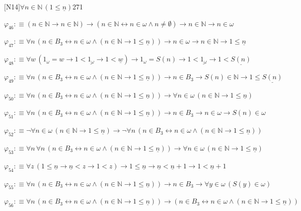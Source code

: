 \begin{fullproof}{[N14]}{$\forall n \in \mathbb{N}\,(1 \leq \underline{n})$}{271}
\begin{abbrevlist}
\item $\varphi_{46} :\equiv (n \in \mathbb{N} \to n \in \mathbb{N}) \to (n \in \mathbb{N} \leftrightarrow n \in \omega \land n \neq \emptyset) \to n \in \mathbb{N} \to n \in \omega$
\item $\varphi_{47} :\equiv \forall n\,(n \in B_{3} \leftrightarrow n \in \omega \land (n \in \mathbb{N} \to 1 \leq \underline{n})) \to n \in \omega \to n \in \mathbb{N} \to 1 \leq \underline{n}$
\item $\varphi_{48} :\equiv \forall w\,(1_{\omega} = w \to 1 < \underline{1_{\omega}} \to 1 < \underline{w}) \to 1_{\omega} = S(n) \to 1 < \underline{1_{\omega}} \to 1 < \underline{S(n)}$
\item $\varphi_{49} :\equiv \forall n\,(n \in B_{3} \leftrightarrow n \in \omega \land (n \in \mathbb{N} \to 1 \leq \underline{n})) \to n \in B_{3} \to S(n) \in \mathbb{N} \to 1 \leq \underline{S(n)}$
\item $\varphi_{50} :\equiv \forall n\,(n \in B_{3} \leftrightarrow n \in \omega \land (n \in \mathbb{N} \to 1 \leq \underline{n})) \to \forall n \in \omega\,(n \in \mathbb{N} \to 1 \leq \underline{n})$
\item $\varphi_{51} :\equiv \forall n\,(n \in B_{3} \leftrightarrow n \in \omega \land (n \in \mathbb{N} \to 1 \leq \underline{n})) \to n \in B_{3} \to n \in \omega \to S(n) \in \omega$
\item $\varphi_{52} :\equiv \neg \forall n \in \omega\,(n \in \mathbb{N} \to 1 \leq \underline{n}) \to \neg \forall n\,(n \in B_{3} \leftrightarrow n \in \omega \land (n \in \mathbb{N} \to 1 \leq \underline{n}))$
\item $\varphi_{53} :\equiv \forall n\,\forall n\,(n \in B_{3} \leftrightarrow n \in \omega \land (n \in \mathbb{N} \to 1 \leq \underline{n})) \to \forall n \in \omega\,(n \in \mathbb{N} \to 1 \leq \underline{n})$
\item $\varphi_{54} :\equiv \forall z\,(1 \leq \underline{n} \to \underline{n} < z \to 1 < z) \to 1 \leq \underline{n} \to \underline{n} < \underline{n} + 1 \to 1 < \underline{n} + 1$
\item $\varphi_{55} :\equiv \forall n\,(n \in B_{3} \leftrightarrow n \in \omega \land (n \in \mathbb{N} \to 1 \leq \underline{n})) \to n \in B_{3} \to \forall y \in \omega\,(S(y) \in \omega)$
\item $\varphi_{56} :\equiv \forall n\,(n \in B_{3} \leftrightarrow n \in \omega \land (n \in \mathbb{N} \to 1 \leq \underline{n})) \to (n \in B_{3} \leftrightarrow n \in \omega \land (n \in \mathbb{N} \to 1 \leq \underline{n}))$

\end{abbrevlist}
\end{fullproof}
